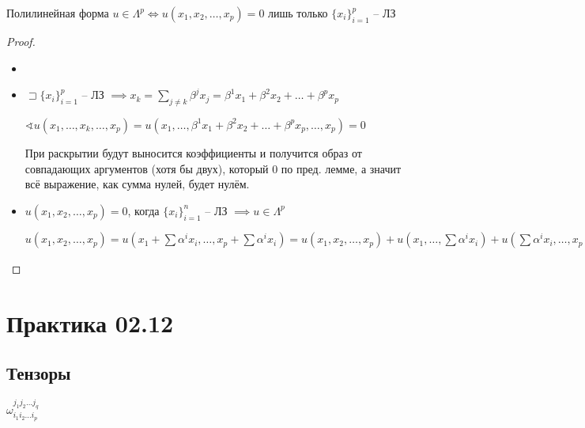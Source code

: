 \documentclass{book}
\theoremstyle{definition}
\begin{document}
    \begin{lemma}
        Полилинейная форма $u\in \Lambda^p \iff u\left( x_1, x_2, \ldots, x_p \right) =0$ лишь только $\{x_i\}_{i=1}^p$ -- ЛЗ
    \end{lemma}
    \begin{proof}
        \begin{itemize}
            \item []
            \item [$\implies$] $\sqsupset \{x_i\}_{i=1}^p$ -- ЛЗ $\implies x_k = \sum_{j\neq k}\beta^jx_j = \beta^1x_1 + \beta^2x_2 + \ldots + \beta^p x_p$

                $\sphericalangle u\left( x_1, \ldots, x_k, \ldots, x_p \right) = u\left( x_1, \ldots, \beta^1x_1+\beta^2x_2+\ldots+\beta^px_p, \ldots, x_p \right) = 0 $ 

                При раскрытии будут выносится коэффициенты и получится образ от совпадающих аргументов (хотя бы двух), который 0 по пред. лемме, а значит всё выражение, как сумма нулей, будет нулём.
            \item [$\impliedby $] $u\left( x_1, x_2, \ldots, x_p \right) = 0 $, когда $\{x_i\}_{i=1}^n$ -- ЛЗ  $\implies u\in \Lambda^p$

                $u\left( x_1, x_2, \ldots, x_p \right) = u\left( x_1 + \sum \alpha^ix_i, \ldots, x_p+\sum \alpha^ix_i \right)  = u(x_1, x_2, \ldots, x_p) + u\left( x_1, \ldots, \sum \alpha^ix_i \right) + u\left( \sum \alpha^ix_i, \ldots, x_p \right) = u\left(x_1, x_2, \ldots, x_p  \right)  + \sum_{j=2}^{p} \alpha^iu\left( x_1, \ldots, x_i \right) + \sum_{i=1}^{p-1} \alpha^iu(x_i, \ldots, x_p) $
        \end{itemize}
    \end{proof}

        \section{Практика 02.12}

        \subsection{Тензоры}

        $\omega_{i_1 i_2 \ldots i_p}^{j_1 j_2 \ldots j_q}$
\end{document}
